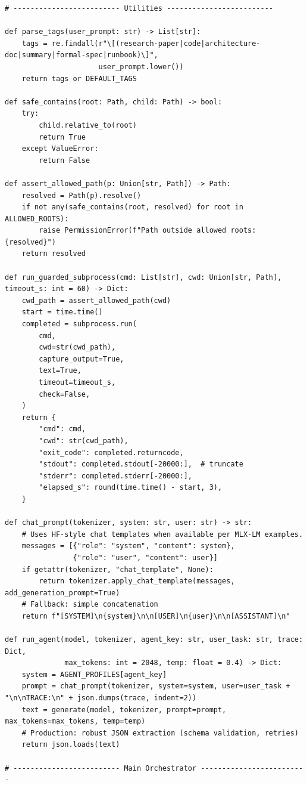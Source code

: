 \documentclass[11pt]{article}
\begin{document}
\begin{lstlisting}[style=python, caption={OODA orchestrator skeleton (single shared MLX-LM model)}]
# ------------------------- Utilities -------------------------

def parse_tags(user_prompt: str) -> List[str]:
    tags = re.findall(r"\[(research-paper|code|architecture-doc|summary|formal-spec|runbook)\]",
                      user_prompt.lower())
    return tags or DEFAULT_TAGS

def safe_contains(root: Path, child: Path) -> bool:
    try:
        child.relative_to(root)
        return True
    except ValueError:
        return False

def assert_allowed_path(p: Union[str, Path]) -> Path:
    resolved = Path(p).resolve()
    if not any(safe_contains(root, resolved) for root in ALLOWED_ROOTS):
        raise PermissionError(f"Path outside allowed roots: {resolved}")
    return resolved

def run_guarded_subprocess(cmd: List[str], cwd: Union[str, Path], timeout_s: int = 60) -> Dict:
    cwd_path = assert_allowed_path(cwd)
    start = time.time()
    completed = subprocess.run(
        cmd,
        cwd=str(cwd_path),
        capture_output=True,
        text=True,
        timeout=timeout_s,
        check=False,
    )
    return {
        "cmd": cmd,
        "cwd": str(cwd_path),
        "exit_code": completed.returncode,
        "stdout": completed.stdout[-20000:],  # truncate
        "stderr": completed.stderr[-20000:],
        "elapsed_s": round(time.time() - start, 3),
    }

def chat_prompt(tokenizer, system: str, user: str) -> str:
    # Uses HF-style chat templates when available per MLX-LM examples.
    messages = [{"role": "system", "content": system},
                {"role": "user", "content": user}]
    if getattr(tokenizer, "chat_template", None):
        return tokenizer.apply_chat_template(messages, add_generation_prompt=True)
    # Fallback: simple concatenation
    return f"[SYSTEM]\n{system}\n\n[USER]\n{user}\n\n[ASSISTANT]\n"

def run_agent(model, tokenizer, agent_key: str, user_task: str, trace: Dict,
              max_tokens: int = 2048, temp: float = 0.4) -> Dict:
    system = AGENT_PROFILES[agent_key]
    prompt = chat_prompt(tokenizer, system=system, user=user_task + "\n\nTRACE:\n" + json.dumps(trace, indent=2))
    text = generate(model, tokenizer, prompt=prompt, max_tokens=max_tokens, temp=temp)
    # Production: robust JSON extraction (schema validation, retries)
    return json.loads(text)

# ------------------------- Main Orchestrator -------------------------


\end{lstlisting}
\end{document}
